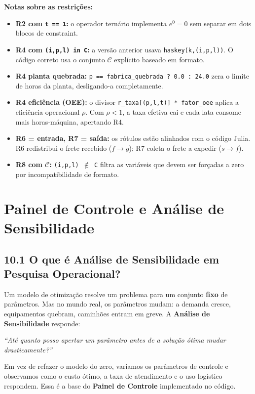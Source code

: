 \documentclass[12pt, a4paper]{article}
\begin{document}
\begin{mdframed}[style=destaque]
\textbf{\color{ballblue}Notas sobre as restri\c{c}\~{o}es:}
\begin{itemize}[leftmargin=1.5em, itemsep=3pt]
  \item \textbf{R2 com \texttt{t == 1}:} o operador tern\'{a}rio implementa $e^0 = 0$
    sem separar em dois blocos de constraint.
  \item \textbf{R4 com \texttt{(i,p,l) in C}:} a vers\~{a}o anterior usava
    \texttt{haskey(k,(i,p,l))}. O c\'{o}digo correto usa o conjunto $\mathcal{C}$
    expl\'{i}cito baseado em formato.
  \item \textbf{R4 planta quebrada:} \texttt{p == fabrica\_quebrada ? 0.0 : 24.0}
    zera o limite de horas da planta, desligando-a completamente.
  \item \textbf{R4 efici\^{e}ncia (OEE):} o divisor \texttt{r\_taxa[(p,l,t)] * fator\_oee}
    aplica a efici\^{e}ncia operacional $\rho$. Com $\rho < 1$, a taxa efetiva cai e cada
    lata consome mais horas-m\'{a}quina, apertando R4.
  \item \textbf{R6 = entrada, R7 = sa\'{i}da:} os r\'{o}tulos est\~{a}o alinhados
    com o c\'{o}digo Julia. R6 redistribui o frete recebido ($f \to g$);
    R7 coleta o frete a expedir ($s \to f$).
  \item \textbf{R8 com $\mathcal{C}$:} \texttt{(i,p,l) \ensuremath{\notin} C}
    filtra as vari\'{a}veis que devem ser for\c{c}adas a zero por incompatibilidade de formato.
\end{itemize}
\end{mdframed}

\newpage
\section{Painel de Controle e An\'{a}lise de Sensibilidade}

\subsection*{10.1 O que \'{e} An\'{a}lise de Sensibilidade em Pesquisa Operacional?}

\begin{mdframed}[style=destaque]
Um modelo de otimiza\c{c}\~{a}o resolve um problema para um conjunto \textbf{fixo} de par\^{a}metros.
Mas no mundo real, os par\^{a}metros mudam: a demanda cresce, equipamentos quebram,
caminhões entram em greve. A \textbf{An\'{a}lise de Sensibilidade} responde:

\begin{center}
  \textit{``At\'{e} quanto posso apertar um par\^{a}metro antes de a solu\c{c}\~{a}o \'{o}tima mudar drasticamente?''}
\end{center}

Em vez de refazer o modelo do zero, variamos os par\^{a}metros de controle e observamos
como o custo \'{o}timo, a taxa de atendimento e o uso log\'{i}stico respondem.
Essa \'{e} a base do \textbf{Painel de Controle} implementado no c\'{o}digo.
\end{mdframed}
\end{document}
